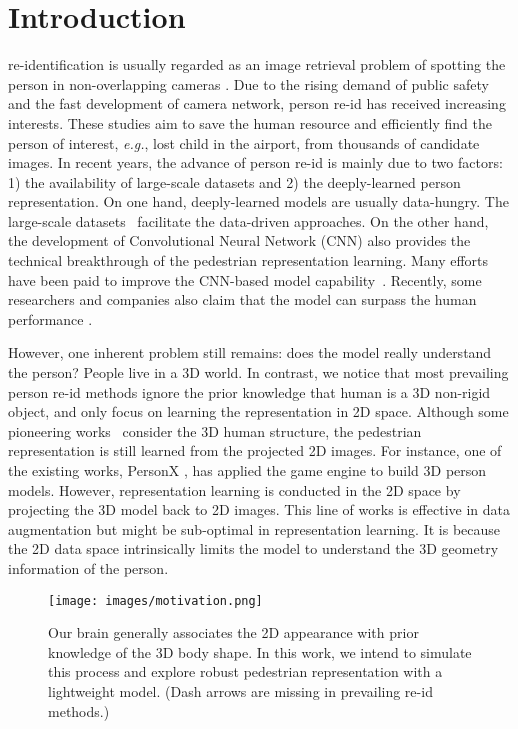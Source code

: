 \documentclass[journal]{IEEEtran}
\def\eg{\emph{e.g.}}
\begin{document}
\section{Introduction}\label{sec:introduction}
 re-identification is usually regarded as an image retrieval problem of spotting the person in non-overlapping cameras \cite{gong2014re,zhang2016learning,zheng2016survey,zheng2018discriminatively,ye2020deep,wang2019beyond}. Due to the rising demand of public safety and the fast development of camera network, person re-id has received increasing interests. These studies aim to save the human resource and efficiently find the person of interest, \eg, lost child in the airport, from thousands of candidate images. In recent years, the advance of person re-id is mainly due to two factors: 1) the availability of large-scale datasets and 2) the deeply-learned person representation. On one hand, deeply-learned models are usually data-hungry. The large-scale datasets~\cite{zheng2015scalable,liu2016large,zheng2017unlabeled,wei2018person} facilitate the data-driven approaches. On the other hand, the development of Convolutional Neural Network (CNN) also provides the technical breakthrough of the pedestrian representation learning. Many efforts have been paid to improve the CNN-based model capability~\cite{zhou2019osnet,li2018harmonious,qian2017multi,qian2019leader}. Recently, some researchers and companies also claim that the model can surpass the human performance \cite{zhang2017alignedreid}.

However, one inherent problem still remains: does the model really understand the person? People live in a 3D world. In contrast, we notice that most prevailing person re-id methods ignore the prior knowledge that human is a 3D non-rigid object, and only focus on learning the representation in 2D space. Although some pioneering works~\cite{barbosa2018looking,sun2019dissecting} consider the 3D human structure, the pedestrian representation is still learned from the projected 2D images. For instance, one of the existing works, PersonX \cite{sun2019dissecting}, has applied the game engine to build 3D person models. However, representation learning is conducted in the 2D space by projecting the 3D model back to 2D images. This line of works is effective in data augmentation but might be sub-optimal in representation learning. It is because the 2D data space intrinsically limits the model to understand the 3D geometry information of the person.

\begin{figure}[t]
\begin{center}
     \texttt{[image: images/motivation.png]}
\end{center} \caption{ Our brain generally associates the 2D appearance with prior knowledge of the 3D body shape. In this work, we intend to simulate this process and explore robust pedestrian representation with a lightweight model. (Dash arrows are missing in prevailing re-id methods.)
      }
      \label{fig:motivation}
\end{figure}
\end{document}
